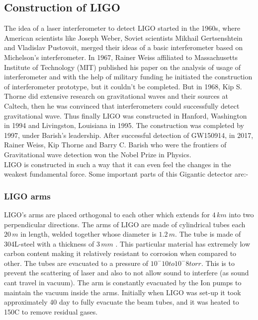 \subsection{Construction of LIGO}

\hspace{1cm} The idea of a laser interferometer to detect LIGO started in the 1960s, where American scientists like Joseph Weber, Soviet scientists Mikhail Gertsenshtein and Vladislav Pustovoit, merged their ideas of a basic interferometer based on Michelson's interferometer. In 1967, Rainer Weiss affiliated to Massachusetts Institute of Technology (MIT) published his paper on the analysis of usage of interferometer and with the help of military funding he initiated the construction of interferometer prototype, but it couldn't be completed. But in 1968, Kip S. Thorne did extensive research on gravitational waves and their sources at Caltech, then he was convinced that interferometers could successfully detect gravitational wave. Thus finally LIGO was constructed in Hanford, Washington in 1994 and Livingston, Louisiana in 1995. The construction was completed by 1997, under Barish's leadership.  After successful detection of GW150914, in 2017, Rainer Weiss, Kip Thorne and Barry C. Barish who were the frontiers of Gravitational wave detection won the Nobel Prize in Physics. \\
LIGO is constructed in such a way that it can even feel the changes in the weakest fundamental force. Some important parts of this Gigantic detector are:- 

\subsubsection{LIGO arms}

LIGO's arms are placed orthogonal to each other which extends for $4\,km$ into two perpendicular directions. The arms of LIGO are made of cylindrical tubes each $20\,m$ in length, welded together whose diameter is $1.2\,m$. The tube is made of 304L-steel with a thickness of $3\,mm$ \cite{carpenter2000laser}. This particular material has extremely low carbon content making it relatively resistant to corrosion when compared to other. The tubes are evacuated to a pressure of $10^-10 to 10^-8 torr.$ This is to prevent the scattering of laser and also to not allow sound to interfere (as sound cant travel in vacuum). The arm is constantly evacuated by the Ion pumps to maintain the vacuum inside the arms. Initially when LIGO was set-up it took approximately 40 day to fully evacuate the beam tubes, and it was heated to 150\degree C to remove residual gases. \cite{vacuum} 

